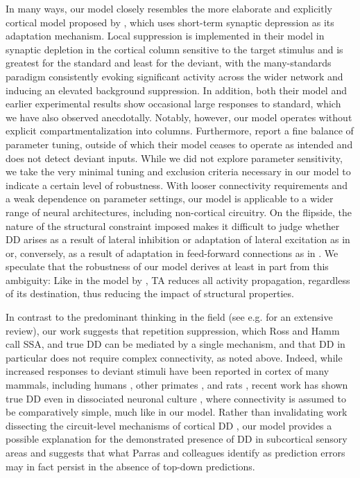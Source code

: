 \documentclass[9pt,lineno,onehalfspacing]{elife}
\begin{document}
In many ways, our model closely resembles the more elaborate and explicitly cortical model proposed by \cite{Yarden2017-eh}, which uses short-term synaptic depression as its adaptation mechanism. Local suppression is implemented in their model in synaptic depletion in the cortical column sensitive to the target stimulus and is greatest for the standard and least for the deviant, with the many-standards paradigm consistently evoking significant activity across the wider network and inducing an elevated background suppression. In addition, both their model and earlier experimental results \citep{Hershenhoren2014-bb} show occasional large responses to standard, which we have also observed anecdotally. Notably, however, our model operates without explicit compartmentalization into columns. Furthermore, \cite{Yarden2017-eh} report a fine balance of parameter tuning, outside of which their model ceases to operate as intended and does not detect deviant inputs. While we did not explore parameter sensitivity, we take the very minimal tuning and exclusion criteria necessary in our model to indicate a certain level of robustness. With looser connectivity requirements and a weak dependence on parameter settings, our model is applicable to a wider range of neural architectures, including non-cortical circuitry. On the flipside, the nature of the structural constraint imposed makes it difficult to judge whether DD arises as a result of lateral inhibition or adaptation of lateral excitation as in \citep{Yarden2017-eh, Hertag2020-kc, Park2020-oa} or, conversely, as a result of adaptation in feed-forward connections as in \cite{Mill2011-ah}. We speculate that the robustness of our model derives at least in part from this ambiguity: Like in the model by \cite{May2015-lt}, TA reduces all activity propagation, regardless of its destination, thus reducing the impact of structural properties.

In contrast to the predominant thinking in the field (see e.g. \cite{Ross2020-qf} for an extensive review), our work suggests that repetition suppression, which Ross and Hamm call SSA, and true DD can be mediated by a single mechanism, and that DD in particular does not require complex connectivity, as noted above. Indeed, while increased responses to deviant stimuli have been reported in cortex of many mammals, including humans \citep{Tada2019-lj}, other primates \citep{Takaura2016-eh}, and rats \citep{Taaseh2011-gg, Shiramatsu2013-qz, Harms2014-ah}, recent work has shown true DD even in dissociated neuronal culture \citep{Kubota2021-dx}, where connectivity is assumed to be comparatively simple, much like in our model. Rather than invalidating work dissecting the circuit-level mechanisms of cortical DD \citep{Hamm2016-lm, Attinger2017-dw, Yarden2022-yy}, our model provides a possible explanation for the demonstrated presence of DD in subcortical sensory areas \citep{Parras2017-fp} and suggests that what Parras and colleagues identify as prediction errors may in fact persist in the absence of top-down predictions.
\end{document}
